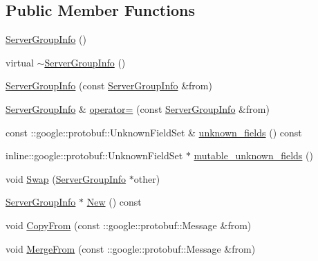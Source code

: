 \subsection*{Public Member Functions}
\begin{DoxyCompactItemize}
\item 
\hyperlink{class_i_m_1_1_base_define_1_1_server_group_info_a4bdabd2c364658a656ab88f8b3e8b12a}{Server\+Group\+Info} ()
\item 
virtual \hyperlink{class_i_m_1_1_base_define_1_1_server_group_info_a42026d15dc49ac4f1cc0af117a93ba90}{$\sim$\+Server\+Group\+Info} ()
\item 
\hyperlink{class_i_m_1_1_base_define_1_1_server_group_info_ab11362678759d33898329221b2e9ec75}{Server\+Group\+Info} (const \hyperlink{class_i_m_1_1_base_define_1_1_server_group_info}{Server\+Group\+Info} \&from)
\item 
\hyperlink{class_i_m_1_1_base_define_1_1_server_group_info}{Server\+Group\+Info} \& \hyperlink{class_i_m_1_1_base_define_1_1_server_group_info_aea1fed9e7807216dcebae142e0f599b6}{operator=} (const \hyperlink{class_i_m_1_1_base_define_1_1_server_group_info}{Server\+Group\+Info} \&from)
\item 
const \+::google\+::protobuf\+::\+Unknown\+Field\+Set \& \hyperlink{class_i_m_1_1_base_define_1_1_server_group_info_a657dbd1313d6c4111b0d1bcf3fdbe86d}{unknown\+\_\+fields} () const 
\item 
inline\+::google\+::protobuf\+::\+Unknown\+Field\+Set $\ast$ \hyperlink{class_i_m_1_1_base_define_1_1_server_group_info_aa20310b4edc1971b3431ed95adc1b18a}{mutable\+\_\+unknown\+\_\+fields} ()
\item 
void \hyperlink{class_i_m_1_1_base_define_1_1_server_group_info_a76ffc308189769b4e7b76447a3c9ecfe}{Swap} (\hyperlink{class_i_m_1_1_base_define_1_1_server_group_info}{Server\+Group\+Info} $\ast$other)
\item 
\hyperlink{class_i_m_1_1_base_define_1_1_server_group_info}{Server\+Group\+Info} $\ast$ \hyperlink{class_i_m_1_1_base_define_1_1_server_group_info_a1667a24c04fe62545a49a2f4216313e5}{New} () const 
\item 
void \hyperlink{class_i_m_1_1_base_define_1_1_server_group_info_a2d3672ebb1b93bb74fcdce4c9ff3e5d4}{Copy\+From} (const \+::google\+::protobuf\+::\+Message \&from)
\item 
void \hyperlink{class_i_m_1_1_base_define_1_1_server_group_info_a6fa187c9a096c2a5c8158dd4c3a461e9}{Merge\+From} (const \+::google\+::protobuf\+::\+Message \&from)
\item 

\end{DoxyCompactItemize}
